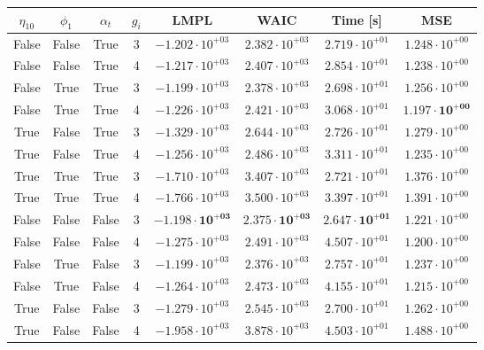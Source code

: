 \documentclass[12pt,a4paper]{article}
\begin{document}
\begin{table}
\centering\begin{tabular}{cccccccc}
\toprule
$\eta_{10}$ & $\phi_1$ & $\alpha_t$ & $g_i$ & LMPL & WAIC & Time [s] & MSE \\
\midrule
False & False & True & 3 & $-1.202 \cdot 10^{+03}$ & $2.382 \cdot 10^{+03}$ & $2.719 \cdot 10^{+01}$ & $1.248 \cdot 10^{+00}$ \\
False & False & True & 4 & $-1.217 \cdot 10^{+03}$ & $2.407 \cdot 10^{+03}$ & $2.854 \cdot 10^{+01}$ & $1.238 \cdot 10^{+00}$  \\
False & True & True & 3 & $-1.199 \cdot 10^{+03}$ & $2.378 \cdot 10^{+03}$ & $2.698 \cdot 10^{+01}$ & $1.256 \cdot 10^{+00}$  \\
False & True & True & 4 & $-1.226 \cdot 10^{+03}$ & $2.421 \cdot 10^{+03}$ & $3.068 \cdot 10^{+01}$ & $\mathbf{1.197 \cdot 10^{+00}}$  \\
True & False & True & 3 & $-1.329 \cdot 10^{+03}$ & $2.644 \cdot 10^{+03}$ & $2.726 \cdot 10^{+01}$ & $1.279 \cdot 10^{+00}$  \\
True & False & True & 4 & $-1.256 \cdot 10^{+03}$ & $2.486 \cdot 10^{+03}$ & $3.311 \cdot 10^{+01}$ & $1.235 \cdot 10^{+00}$  \\
True & True & True & 3 & $-1.710 \cdot 10^{+03}$ & $3.407 \cdot 10^{+03}$ & $2.721 \cdot 10^{+01}$ & $1.376 \cdot 10^{+00}$ \\
True & True & True & 4 & $-1.766 \cdot 10^{+03}$ & $3.500 \cdot 10^{+03}$ & $3.397 \cdot 10^{+01}$ & $1.391 \cdot 10^{+00}$ \\
False & False & False & 3 & $\mathbf{-1.198 \cdot 10^{+03}}$ & $\mathbf{2.375 \cdot 10^{+03}}$ & $\mathbf{2.647 \cdot 10^{+01}}$ & $1.221 \cdot 10^{+00}$  \\
False & False & False & 4 & $-1.275 \cdot 10^{+03}$ & $2.491 \cdot 10^{+03}$ & $4.507 \cdot 10^{+01}$ & $1.200 \cdot 10^{+00}$  \\
False & True & False & 3 & $-1.199 \cdot 10^{+03}$ & $2.376 \cdot 10^{+03}$ & $2.757 \cdot 10^{+01}$ & $1.237 \cdot 10^{+00}$ \\
False & True & False & 4 & $-1.264 \cdot 10^{+03}$ & $2.473 \cdot 10^{+03}$ & $4.155 \cdot 10^{+01}$ & $1.215 \cdot 10^{+00}$ \\
True & False & False & 3 & $-1.279 \cdot 10^{+03}$ & $2.545 \cdot 10^{+03}$ & $2.700 \cdot 10^{+01}$ & $1.262 \cdot 10^{+00}$ \\
True & False & False & 4 & $-1.958 \cdot 10^{+03}$ & $3.878 \cdot 10^{+03}$ & $4.503 \cdot 10^{+01}$ & $1.488 \cdot 10^{+00}$ \\

\end{tabular}
\end{table}
\end{document}
